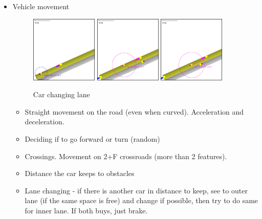 \begin{itemize}
    \item Vehicle movement
        \begin{figure}
            \caption{Car changing lane}
            \label{fig:carKeepingDistance}
            \centering
            \includegraphics[width=0.3\textwidth]{figs/carMovement/car_keeping_distance_to_other.png}
            \hspace{0.2em}
            \includegraphics[width=0.3\textwidth]{figs/carMovement/car_lane_change_before.png}
            \hspace{0.2em}
            \includegraphics[width=0.3\textwidth]{figs/carMovement/car_lane_change_after.png}
        \end{figure}

    \begin{itemize}
        \item Straight movement on the road (even when curved). Acceleration and deceleration.
        \item Deciding if to go forward or turn (random)
        \item Crossings. Movement on 2+F crossroads (more than 2 features).
        \item Distance the car keeps to obstacles
        \item Lane changing - if there is another car in distance to keep, see to outer lane (if the same space is free) and change if possible, then try to do same for inner lane. If both buys, just brake.
    \end{itemize}

\end{itemize}



